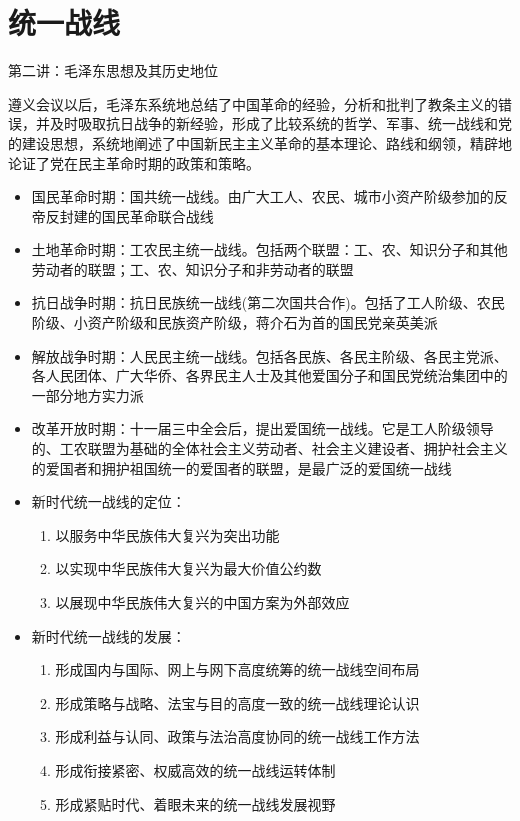 \documentclass[
]{ctexart}
\providecommand{\tightlist}{%
  \setlength{\itemsep}{0pt}\setlength{\parskip}{0pt}}
\begin{document}
\hypertarget{ux7edfux4e00ux6218ux7ebf}{%
\section{统一战线}\label{ux7edfux4e00ux6218ux7ebf}}

第二讲：毛泽东思想及其历史地位

遵义会议以后，毛泽东系统地总结了中国革命的经验，分析和批判了教条主义的错误，并及时吸取抗日战争的新经验，形成了比较系统的哲学、军事、统一战线和党的建设思想，系统地阐述了中国新民主主义革命的基本理论、路线和纲领，精辟地论证了党在民主革命时期的政策和策略。

\begin{itemize}
\tightlist
\item
  国民革命时期：国共统一战线。由广大工人、农民、城市小资产阶级参加的反帝反封建的国民革命联合战线
\item
  土地革命时期：工农民主统一战线。包括两个联盟：工、农、知识分子和其他劳动者的联盟；工、农、知识分子和非劳动者的联盟
\item
  抗日战争时期：抗日民族统一战线(第二次国共合作)。包括了工人阶级、农民阶级、小资产阶级和民族资产阶级，蒋介石为首的国民党亲英美派
\item
  解放战争时期：人民民主统一战线。包括各民族、各民主阶级、各民主党派、各人民团体、广大华侨、各界民主人士及其他爱国分子和国民党统治集团中的一部分地方实力派
\item
  改革开放时期：十一届三中全会后，提出爱国统一战线。它是工人阶级领导的、工农联盟为基础的全体社会主义劳动者、社会主义建设者、拥护社会主义的爱国者和拥护祖国统一的爱国者的联盟，是最广泛的爱国统一战线
\item
  新时代统一战线的定位：

  \begin{enumerate}
  \def\labelenumi{\arabic{enumi}.}
  \tightlist
  \item
    以服务中华民族伟大复兴为突出功能
  \item
    以实现中华民族伟大复兴为最大价值公约数
  \item
    以展现中华民族伟大复兴的中国方案为外部效应
  \end{enumerate}
\item
  新时代统一战线的发展：

  \begin{enumerate}
  \def\labelenumi{\arabic{enumi}.}
  \tightlist
  \item
    形成国内与国际、网上与网下高度统筹的统一战线空间布局
  \item
    形成策略与战略、法宝与目的高度一致的统一战线理论认识
  \item
    形成利益与认同、政策与法治高度协同的统一战线工作方法
  \item
    形成衔接紧密、权威高效的统一战线运转体制
  \item
    形成紧贴时代、着眼未来的统一战线发展视野
  \end{enumerate}
\end{itemize}
\end{document}
